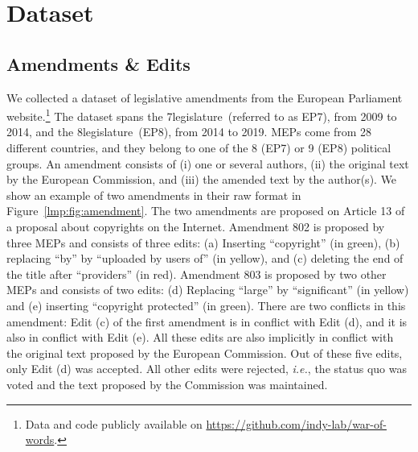 \section{Dataset}
\label{lmp:sec:data}

\subsection{Amendments \& Edits}

We collected a dataset of  legislative amendments from the European Parliament website.\footnote{Data and code publicly available on \href{https://github.com/indy-lab/war-of-words}{https://github.com/indy-lab/war-of-words}.}
The dataset spans the 7\th legislature~(referred to as EP7), from 2009 to 2014, and the 8\th legislature~(EP8), from 2014 to 2019.
MEPs come from 28 different countries, and they belong to one of the 8 (EP7) or 9 (EP8) political groups.
An amendment consists of (i) one or several authors, (ii) the original text by the European Commission, and (iii) the amended text by the author(s).
We show an example of two amendments in their raw format in Figure~\ref{lmp:fig:amendment}.
The two amendments are proposed on Article 13 of a proposal about copyrights on the Internet.
Amendment 802 is proposed by three MEPs and consists of three edits:
(a) Inserting ``copyright'' (in green), (b) replacing ``by'' by ``uploaded by users of'' (in yellow), and (c) deleting the end of the title after ``providers'' (in red).
Amendment 803 is proposed by two other MEPs and consists of two edits:
(d) Replacing ``large'' by ``significant'' (in yellow) and (e) inserting ``copyright protected'' (in green).
There are two conflicts in this amendment:
Edit (c) of the first amendment is in conflict with Edit (d), and it is also in conflict with Edit (e).
All these edits are also implicitly in conflict with the original text proposed by the European Commission.
Out of these five edits, only Edit (d) was accepted.
All other edits were rejected, \textit{i.e.}, the status quo was voted and the text proposed by the Commission was maintained.

